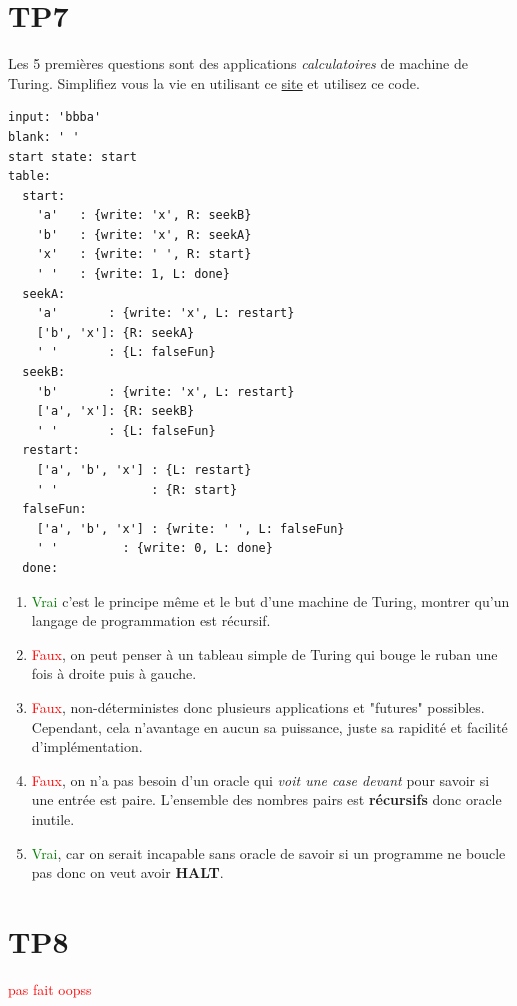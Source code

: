 \documentclass{report}
\begin{document}
\section{TP7}
Les 5 premières questions sont des applications \textit{calculatoires} de machine de Turing. Simplifiez vous la vie en utilisant ce \href{https://turingmachine.io}{site} et utilisez ce code.
\begin{lstlisting}[showstringspaces=false]
input: 'bbba'
blank: ' '
start state: start
table:
  start:
    'a'   : {write: 'x', R: seekB}
    'b'   : {write: 'x', R: seekA}
    'x'   : {write: ' ', R: start}
    ' '   : {write: 1, L: done}
  seekA:
    'a'       : {write: 'x', L: restart}
    ['b', 'x']: {R: seekA}
    ' '       : {L: falseFun}
  seekB:
    'b'       : {write: 'x', L: restart}
    ['a', 'x']: {R: seekB}
    ' '       : {L: falseFun}
  restart:
    ['a', 'b', 'x'] : {L: restart}
    ' '             : {R: start}
  falseFun:
    ['a', 'b', 'x'] : {write: ' ', L: falseFun}
    ' '   	    : {write: 0, L: done}
  done:
\end{lstlisting}
\begin{enumerate}
\item \textcolor{green}{Vrai} c'est le principe même et le but d'une machine de Turing, montrer qu'un langage de programmation est récursif.
\item \textcolor{red}{Faux}, on peut penser à un tableau simple de Turing qui bouge le ruban une fois à droite puis à gauche.
\item \textcolor{red}{Faux}, non-déterministes donc plusieurs applications et "futures" possibles. Cependant, cela n'avantage en aucun sa puissance, juste sa rapidité et facilité d'implémentation.
\item \textcolor{red}{Faux}, on n'a pas besoin d'un oracle qui \textit{voit une case devant} pour savoir si une entrée est paire. L'ensemble des nombres pairs est \textbf{récursifs} donc oracle inutile.
\item \textcolor{green}{Vrai}, car on serait incapable sans oracle de savoir si un programme ne boucle pas donc on veut avoir \textbf{HALT}.
\end{enumerate}

\section{TP8}
\textcolor{red}{pas fait oopss}
\end{document}

